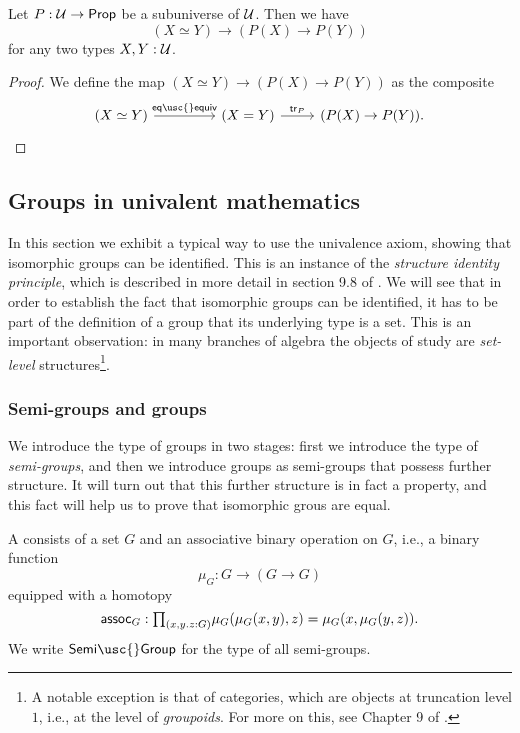 \begin{thm}
  Let $P:\mathcal{U}\to\mathsf{Prop}$ be a subuniverse of $\mathcal{U}$. Then we have
  \begin{equation*}
    (X\simeq Y)\to (P(X) \to P(Y))
  \end{equation*}
  for any two types $X,Y:\mathcal{U}$.
\end{thm}

\begin{proof}
  We define the map $(X\simeq Y)\to (P(X)\to P(Y))$ as the composite
  \begin{equation*}
    \begin{tikzcd}
      (X\simeq Y) \arrow[r,"\mathsf{eq\usc{}equiv}"] &[2em] (X=Y) \arrow[r,"\mathsf{tr}_P"] & (P(X)\to P(Y)).
    \end{tikzcd}\qedhere
  \end{equation*}
\end{proof}


\subsection{Groups in univalent mathematics}

In this section we exhibit a typical way to use the univalence axiom, showing that isomorphic groups can be identified.
This is an instance of the \emph{structure identity principle}, which is described in more detail in section 9.8 of \cite{hottbook}.
We will see that in order to establish the fact that isomorphic groups can be identified, it has to be part of the definition of a group that its underlying type is a set. This is an important observation: in many branches of algebra the objects of study are \emph{set-level} structures\footnote{A notable exception is that of categories, which are objects at truncation level $1$, i.e., at the level of \emph{groupoids}. For more on this, see Chapter 9 of \cite{hottbook}.}.

\subsubsection{Semi-groups and groups}
We introduce the type of groups in two stages: first we introduce the type of \emph{semi-groups}, and then we introduce groups as semi-groups that possess further structure. It will turn out that this further structure is in fact a property, and this fact will help us to prove that isomorphic grous are equal.

\begin{defn}
  A  consists of a set $G$ and an associative binary operation on $G$, i.e., a binary function
  \begin{equation*}
    \mu_G : G \to (G \to G)
  \end{equation*}
  equipped with a homotopy
  \begin{equation*}
    \mathsf{assoc}_G : \prd{x,y.z:G}\mu_G(\mu_G(x,y),z)=\mu_G(x,\mu_G(y,z)).
  \end{equation*}
  We write $\mathsf{Semi\usc{}Group}$ for the type of all semi-groups.
\end{defn}

